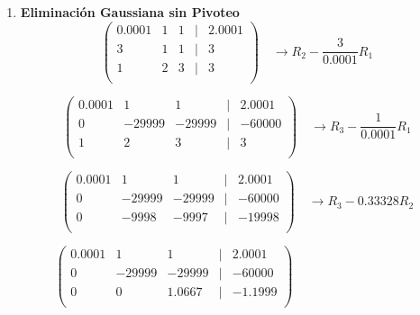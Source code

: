     \begin{enumerate}
        \item \textbf{Eliminación Gaussiana sin Pivoteo} \\
        
            \[ \left( \begin{array}{ccccc}
                 0.0001 & 1 & 1 & | & 2.0001    \\
                 3      & 1 & 1 & | & 3         \\
                 1      & 2 & 3 & | & 3         \\
            \end{array}
            \right) \quad \rightarrow R_2 - \frac{3}{0.0001}R_1 
            \]
            
            \[ \left( \begin{array}{ccccc}
                 0.0001 & 1         & 1         & | & 2.0001    \\
                 0      & -29999    & -29999    & | & -60000    \\
                 1      & 2         & 3         & | & 3         \\
            \end{array}
            \right) \quad \rightarrow R_3 - \frac{1}{0.0001}R_1
            \]
            
            \[ \left( \begin{array}{ccccc}
                 0.0001 & 1         & 1         & | & 2.0001    \\
                 0      & -29999    & -29999    & | & -60000    \\
                 0      & -9998     & -9997     & | & -19998    \\
            \end{array}
            \right) \quad \rightarrow R_3 - 0.33328R_2
            \]
            
            \[ \left( \begin{array}{ccccc}
                 0.0001 & 1         & 1         & | & 2.0001    \\
                 0      & -29999    & -29999    & | & -60000    \\
                 0      & 0         & 1.0667    & | & -1.1999   \\
            \end{array}
            \right) \quad \quad \quad \quad \quad \quad \quad \quad \quad \quad
            \]
            

\end{enumerate}
